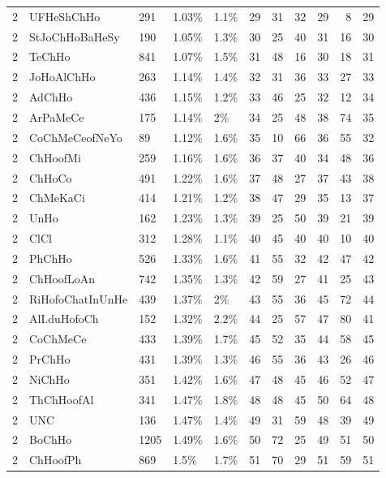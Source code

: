\begin{longtable}{lllllrrrrrr}
  2 & UFHeShChHo & 291 & 1.03\% & 1.1\% &  29 &  31 &  32 &  29 &   8 &  29 \\ 
  2 & StJoChHoBaHeSy & 190 & 1.05\% & 1.3\% &  30 &  25 &  40 &  31 &  16 &  30 \\ 
  2 & TeChHo & 841 & 1.07\% & 1.5\% &  31 &  48 &  16 &  30 &  18 &  31 \\ 
  2 & JoHoAlChHo & 263 & 1.14\% & 1.4\% &  32 &  31 &  36 &  33 &  27 &  33 \\ 
  2 & AdChHo & 436 & 1.15\% & 1.2\% &  33 &  46 &  25 &  32 &  12 &  34 \\ 
  2 & ArPaMeCe & 175 & 1.14\% & 2\% &  34 &  25 &  48 &  38 &  74 &  35 \\ 
  2 & CoChMeCeofNeYo & 89 & 1.12\% & 1.6\% &  35 &  10 &  66 &  36 &  55 &  32 \\ 
  2 & ChHoofMi & 259 & 1.16\% & 1.6\% &  36 &  37 &  40 &  34 &  48 &  36 \\ 
  2 & ChHoCo & 491 & 1.22\% & 1.6\% &  37 &  48 &  27 &  37 &  43 &  38 \\ 
  2 & ChMeKaCi & 414 & 1.21\% & 1.2\% &  38 &  47 &  29 &  35 &  13 &  37 \\ 
  2 & UnHo & 162 & 1.23\% & 1.3\% &  39 &  25 &  50 &  39 &  21 &  39 \\ 
  2 & ClCl & 312 & 1.28\% & 1.1\% &  40 &  45 &  40 &  40 &  10 &  40 \\ 
  2 & PhChHo & 526 & 1.33\% & 1.6\% &  41 &  55 &  32 &  42 &  47 &  42 \\ 
  2 & ChHoofLoAn & 742 & 1.35\% & 1.3\% &  42 &  59 &  27 &  41 &  25 &  43 \\ 
  2 & RiHofoChatInUnHe & 439 & 1.37\% & 2\% &  43 &  55 &  36 &  45 &  72 &  44 \\ 
  2 & AlI.duHofoCh & 152 & 1.32\% & 2.2\% &  44 &  25 &  57 &  47 &  80 &  41 \\ 
  2 & CoChMeCe & 433 & 1.39\% & 1.7\% &  45 &  52 &  35 &  44 &  58 &  45 \\ 
  2 & PrChHo & 431 & 1.39\% & 1.3\% &  46 &  55 &  36 &  43 &  26 &  46 \\ 
  2 & NiChHo & 351 & 1.42\% & 1.6\% &  47 &  48 &  45 &  46 &  52 &  47 \\ 
  2 & ThChHoofAl & 341 & 1.47\% & 1.8\% &  48 &  48 &  45 &  50 &  64 &  48 \\ 
  2 & UNC & 136 & 1.47\% & 1.4\% &  49 &  31 &  59 &  48 &  39 &  49 \\ 
  2 & BoChHo & 1205 & 1.49\% & 1.6\% &  50 &  72 &  25 &  49 &  51 &  50 \\ 
  2 & ChHoofPh & 869 & 1.5\% & 1.7\% &  51 &  70 &  29 &  51 &  59 &  51 \\ 

\end{longtable}
